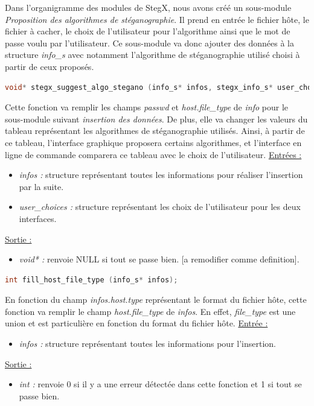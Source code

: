 \documentclass[11pt]{article}
\begin{document}
Dans l'organigramme des modules de StegX, nous avons créé un sous-module 
\textit{Proposition des algorithmes de stéganographie}. Il prend en entrée 
le fichier hôte, le fichier à cacher, le choix de l'utilisateur pour 
l'algorithme ainsi que le mot de passe voulu par l'utilisateur. 
Ce sous-module va donc ajouter des données à la structure \textit{info\_s} 
avec notamment l'algorithme de stéganographie utilisé choisi à partir de ceux 
proposés. 

\begin{lstlisting}[language=c]
void* stegx_suggest_algo_stegano (info_s* infos, stegx_info_s* user_choices);
\end{lstlisting}

Cette fonction va remplir les champs \textit{passwd} et \textit{host.file\_type} 
de \textit{info} pour le sous-module suivant \textit{insertion des données}. 
De plus, elle va changer les valeurs du tableau représentant les algorithmes 
de stéganographie utilisés. Ainsi, à partir de ce tableau, l'interface graphique 
proposera certains algorithmes, et l'interface en ligne de commande comparera 
ce tableau avec le choix de l'utilisateur. 
\newline
\underline{Entrées :} 
\begin{itemize}
\item \textit{infos :} structure représentant toutes les informations pour 
réaliser l'insertion par la suite. 
\item \textit{user\_choices :} structure représentant les choix de 
l'utilisateur pour les deux interfaces. 
\end{itemize}
\underline{Sortie :} 
\begin{itemize}
\item \textit{void* :} renvoie NULL si tout se passe bien. [a remodifier 
comme definition]. 
\newline 
\end{itemize}

\begin{lstlisting}[language=c]
int fill_host_file_type (info_s* infos);
\end{lstlisting}

En fonction du champ \textit{infos.host.type} représentant le format du 
fichier hôte, cette fonction va remplir le champ \textit{host.file\_type} 
de \textit{infos}. En effet, \textit{file\_type} est une union et est 
particulière en fonction du format du fichier hôte. 
\newline
\underline{Entrée :} 
\begin{itemize}
\item \textit{infos :} structure représentant toutes les informations pour 
l'insertion. 
\end{itemize}
\underline{Sortie :} 
\begin{itemize}
\item \textit{int :} renvoie 0 si il y a une erreur détectée dans cette 
fonction et 1 si tout se passe bien. 
\newline 
\end{itemize}
\end{document}
